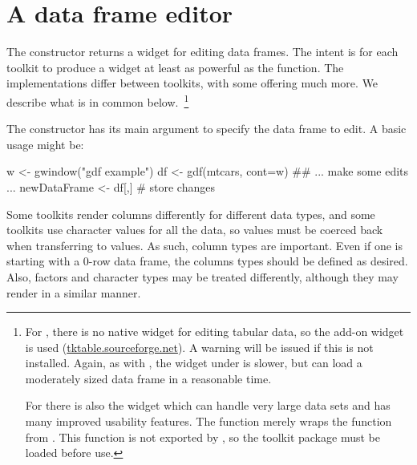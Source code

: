 

\section{A data frame editor}
\label{sec:gWidgets-an-editor-tabular}

The  constructor returns a widget for editing data
frames. The intent is for each toolkit to produce a widget at least as
powerful as the  function. The implementations
differ between toolkits, with some offering much more. We describe
what is in common below.~\footnote{ For , there is
  no native widget for editing tabular data, so the 
  add-on widget is used (\url{tktable.sourceforge.net}). A warning
  will be issued if this is not installed. Again, as with
  , the widget under  is slower,
  but can load a moderately sized data frame in a reasonable time. 
  
  For  there is also the 
  widget which can handle very large data sets and has many improved
  usability features. The  function merely wraps the
   function from . This function
  is not exported by , so the toolkit package must be
  loaded before use. }


The constructor has its main argument  to specify the data
frame to edit. A basic usage might be:

\begin{Schunk}
\begin{Sinput}
 w <- gwindow("gdf example")
 df <- gdf(mtcars, cont=w)
 ## ... make some edits ...
 newDataFrame <- df[,]                   # store changes
\end{Sinput}
\end{Schunk}
%

Some toolkits render columns differently for different data types, and
some toolkits use character values for all the data, so values must be
coerced back when transferring to \R\/ values. As such, column types
are important. Even if one is starting with a $0$-row data frame, the
columns types should be defined as desired. Also, factors and
character types may be treated differently, although they may render
in a similar manner.

